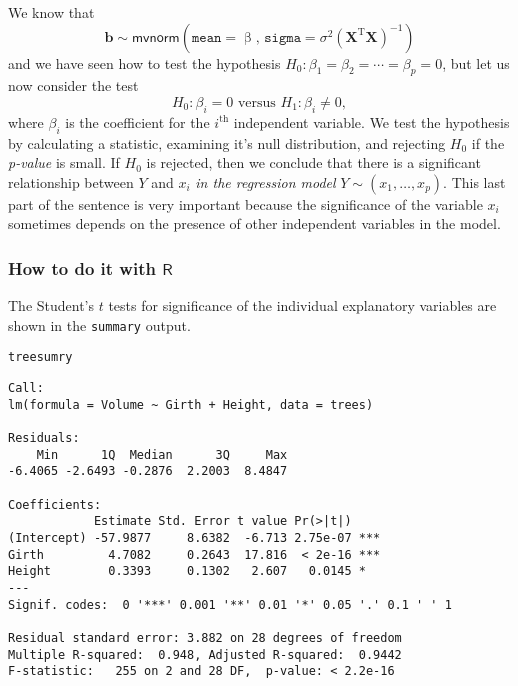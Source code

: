 We know that
\begin{equation}
\mathbf{b}\sim\mathsf{mvnorm}\left(\mathtt{mean}=\upbeta,\,\mathtt{sigma}=\sigma^{2}\left(\mathbf{X}^{\mathrm{T}}\mathbf{X}\right)^{-1}\right)
\end{equation}
and we have seen how to test the hypothesis \(H_{0}:\beta_{1}=\beta_{2}=\cdots=\beta_{p}=0\), but let us now consider the test
\begin{equation}
H_{0}:\beta_{i}=0\mbox{ versus }H_{1}:\beta_{i}\neq0,
\end{equation}
where \(\beta_{i}\) is the coefficient for the \(i^{\textrm{th}}\)
independent variable. We test the hypothesis by calculating a
statistic, examining it's null distribution, and rejecting \(H_{0}\)
if the \emph{p-value} is small. If \(H_{0}\) is rejected, then we conclude
that there is a significant relationship between \(Y\) and \(x_{i}\)
\emph{in the regression model} \(Y\sim(x_{1},\ldots,x_{p})\). This last
part of the sentence is very important because the significance of the
variable \(x_{i}\) sometimes depends on the presence of other
independent variables in the model.

\subsubsection{How to do it with \(\mathsf{R}\)}
\label{sec-12-3-3-1}

The Student's \(t\) tests for significance of the individual explanatory variables are shown in the \texttt{summary} output.

\begin{verbatim}
treesumry
\end{verbatim}

\begin{verbatim}
Call:
lm(formula = Volume ~ Girth + Height, data = trees)

Residuals:
    Min      1Q  Median      3Q     Max 
-6.4065 -2.6493 -0.2876  2.2003  8.4847 

Coefficients:
            Estimate Std. Error t value Pr(>|t|)    
(Intercept) -57.9877     8.6382  -6.713 2.75e-07 ***
Girth         4.7082     0.2643  17.816  < 2e-16 ***
Height        0.3393     0.1302   2.607   0.0145 *  
---
Signif. codes:  0 '***' 0.001 '**' 0.01 '*' 0.05 '.' 0.1 ' ' 1

Residual standard error: 3.882 on 28 degrees of freedom
Multiple R-squared:  0.948,	Adjusted R-squared:  0.9442 
F-statistic:   255 on 2 and 28 DF,  p-value: < 2.2e-16
\end{verbatim}


